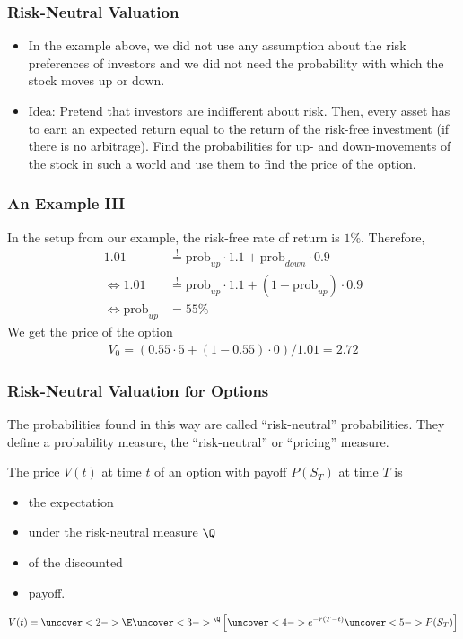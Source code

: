 \begin{frame}[fragile]
\frametitle{Risk-Neutral Valuation}
\begin{itemize}
  \item In the example above, we did not use any assumption about the risk
  preferences of investors and we did not need the probability with which the
  stock moves up or down.
  \item Idea: Pretend that investors are indifferent about risk. Then, every
  asset has to earn an expected return equal to the return of the risk-free
  investment (if there is no arbitrage). Find the probabilities for up- and
  down-movements of the stock in such a world and use them to find the price of
  the option.
\end{itemize}
\end{frame}

\begin{frame}[fragile]
\frametitle{An Example III}
In the setup from our example, the risk-free rate of return is $1\%$. Therefore,
\begin{align*}
  1.01 &\stackrel{!}{=} \text{prob}_{up} \cdot 1.1 + \text{prob}_{down} \cdot 0.9 \\
  \Leftrightarrow 1.01 &\stackrel{!}{=} \text{prob}_{up} \cdot 1.1 + (1-\text{prob}_{up})
  \cdot 0.9 \\
  \Leftrightarrow \text{prob}_{up} &= 55\%
\end{align*}
We get the price of the option
\begin{align*}
  V_0 = (0.55 \cdot 5 + (1-0.55)\cdot 0)/1.01 = 2.72
\end{align*}
\end{frame}

\begin{frame}[fragile]
\frametitle{Risk-Neutral Valuation for Options}
The probabilities found in this way are called ``risk-neutral'' probabilities.
They define a probability measure, the ``risk-neutral'' or ``pricing''
measure.\\
\vspace{0.5cm}

The price $V(t)$ at time $t$ of an option with payoff $P(S_T)$ at time $T$ is
\begin{itemize}
  \item<2-> the expectation 
  \item<3-> under the risk-neutral measure $\Q$
  \item<4-> of the discounted
  \item<5-> payoff.
\end{itemize}
\begin{block}{}
\begin{align*}
  V(t) = \uncover<2->{\E\uncover<3->{^\Q}\left[ \uncover<4->{e^{-r(T-t)}}
  \uncover<5->{P(S_T)}\right]}
\end{align*}
\end{block}
\end{frame}

